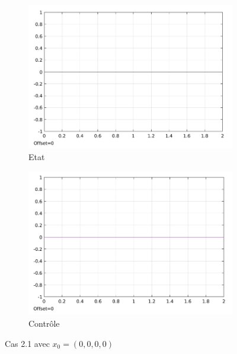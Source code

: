 \documentclass[a4paper]{article}
\begin{document}
                        \begin{figure}[h!]
                                \centering
                                \begin{subfigure}[b]{0.45\textwidth}
                                        \includegraphics[width=\textwidth]{images/courbe_cas_3_1_TP03.png}
                                        \caption{Etat}
                                        \label{fig3.11.1}
                                \end{subfigure}
                                \hspace{30pt}
                                \begin{subfigure}[b]{0.45\textwidth}
                                        \includegraphics[width=\textwidth]{images/controle_cas_3_1_TP03.png}
                                        \caption{Contrôle}
                                        \label{fig3.11.2}
                                \end{subfigure}
                                \caption{Cas 2.1 avec $x_0=(0,0,0,0)$}
                                \label{fig3.11}
                        \end{figure}
\end{document}
